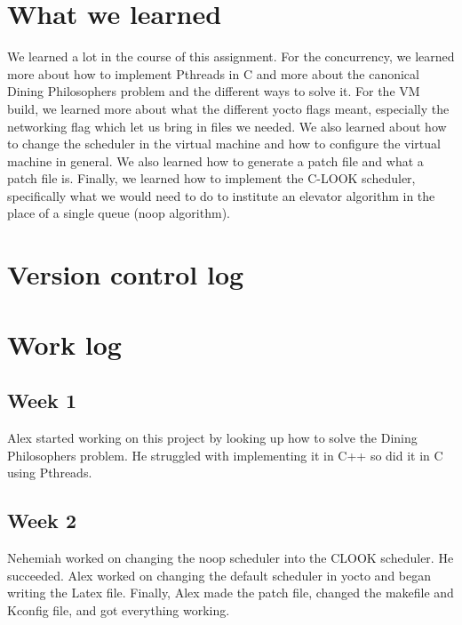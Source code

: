 \documentclass[letterpaper,10pt,titlepage]{article}
\begin{document}
\section{What we learned}
We learned a lot in the course of this assignment. For the concurrency, we learned more about how to implement Pthreads in C and more about the canonical Dining Philosophers problem and the different ways to solve it. For the VM build, we learned more about what the different yocto flags meant, especially the networking flag which let us bring in files we needed. We also learned about how to change the scheduler in the virtual machine and how to configure the virtual machine in general. We also learned how to generate a patch file and what a patch file is. Finally, we learned how to implement the C-LOOK scheduler, specifically what we would need to do to institute an elevator algorithm in the place of a single queue (noop algorithm).

\section{Version control log}
\begin{versionhistory}
\end{versionhistory}

\section{Work log}
\subsection{Week 1}
Alex started working on this project by looking up how to solve the Dining Philosophers problem. He struggled with implementing it in C++ so did it in C using Pthreads.
\subsection{Week 2}
Nehemiah worked on changing the noop scheduler into the CLOOK scheduler. He succeeded. Alex worked on changing the default scheduler in yocto and began writing the Latex file. Finally, Alex made the patch file, changed the makefile and Kconfig file, and got everything working.

%
%
\end{document}
